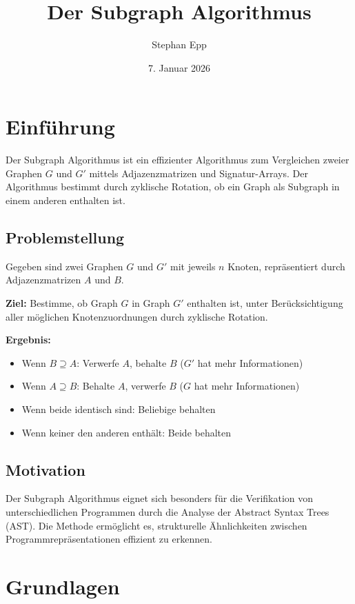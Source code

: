 ﻿\documentclass[a4paper,12pt]{article}
\title{Der Subgraph Algorithmus}
\author{Stephan Epp}
\date{7. Januar 2026}
\theoremstyle{definition}
\begin{document}
	
\maketitle

\tableofcontents
\newpage

\section{Einführung}

Der Subgraph Algorithmus ist ein effizienter Algorithmus zum Vergleichen zweier Graphen $G$ und $G'$ mittels Adjazenzmatrizen und Signatur-Arrays. Der Algorithmus bestimmt durch zyklische Rotation, ob ein Graph als Subgraph in einem anderen enthalten ist.

\subsection{Problemstellung}

Gegeben sind zwei Graphen $G$ und $G'$ mit jeweils $n$ Knoten, repräsentiert durch Adjazenzmatrizen $A$ und $B$.

\textbf{Ziel:} Bestimme, ob Graph $G$ in Graph $G'$ enthalten ist, unter Berücksichtigung aller möglichen Knotenzuordnungen durch zyklische Rotation.

\textbf{Ergebnis:}
\begin{itemize}
	\item Wenn $B \supseteq A$: Verwerfe $A$, behalte $B$ ($G'$ hat mehr Informationen)
	\item Wenn $A \supseteq B$: Behalte $A$, verwerfe $B$ ($G$ hat mehr Informationen)
	\item Wenn beide identisch sind: Beliebige behalten
	\item Wenn keiner den anderen enthält: Beide behalten
\end{itemize}

\subsection{Motivation}

Der Subgraph Algorithmus eignet sich besonders für die Verifikation von unterschiedlichen Programmen durch die Analyse der Abstract Syntax Trees (AST). Die Methode ermöglicht es, strukturelle Ähnlichkeiten zwischen Programmrepräsentationen effizient zu erkennen.

\section{Grundlagen}
\end{document}
